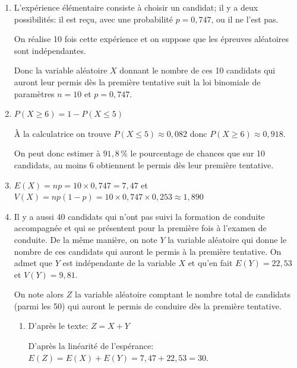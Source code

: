 		\begin{enumerate}
			\item %
L'expérience élémentaire consiste à choisir un candidat; il y a deux possibilités: il est reçu, avec une probabilité $p=0,747$, ou il ne l'est pas.

On réalise 10 fois cette expérience et on suppose que les épreuves aléatoires sont indépendantes.

Donc  la variable aléatoire $X$ donnant le nombre de ces 10 candidats qui auront leur permis dès la première tentative suit la loi binomiale de paramètres $n=10$ et $p=0,747$.

			\item %
$P(X \geqslant 6) = 1-  P(X \leqslant 5)$

À la calculatrice on trouve  $P(X \leqslant 5) \approx 0,082$ donc $P(X \geqslant 6) \approx 0,918$.

On peut donc estimer à $91,8\,\%$ le pourcentage de chances que sur 10 candidats, au moins 6 obtiennent le permis dès leur première tentative.

			\item %
$E(X)=np=10\times 0,747=7,47$ et $V(X)=np\left (1-p\right )=10\times 0,747 \times 0,253 \approx 1,890$

			\item Il y a aussi 40 candidats qui n'ont pas suivi la formation de conduite accompagnée et qui se présentent pour la première fois à l'examen de conduite. De la même manière, on note $Y$ la variable aléatoire qui donne le nombre de ces candidats qui auront le permis à la première tentative. On admet que $Y$ est indépendante de la variable $X$ et qu'en fait $E(Y)=22,53$ et $V(Y)=9,81$.


			On note alors $Z$ la variable aléatoire comptant le nombre total de candidats (parmi les 50) qui auront le permis de conduire dès la première tentative.


			\begin{enumerate}
				\item %
D'après le texte: $Z=X+Y$ 

D'après la linéarité de l'espérance: $E(Z)=E(X)+E(Y) = 7,47+ 22,53 = 30$.


\end{enumerate}
\end{enumerate}
